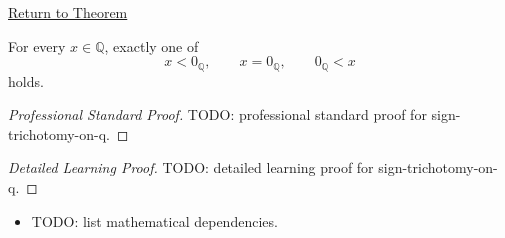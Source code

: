 \newpage
{}
\label{prf:sign-trichotomy-on-q}

\begin{remark*}[Return]
\hyperref[thm:sign-trichotomy-on-q]{Return to Theorem}
\end{remark*}

\begin{theorem*}
For every $x\in\mathbb{Q}$, exactly one of
\[
x<0_{\mathbb{Q}},\qquad x=0_{\mathbb{Q}},\qquad 0_{\mathbb{Q}}<x
\]
holds.
\end{theorem*}

\begin{proof}[Professional Standard Proof]
\LRAProofBodyStart
TODO: professional standard proof for sign-trichotomy-on-q.
\end{proof}

\begin{proof}[Detailed Learning Proof]
\LRAProofBodyStart
TODO: detailed learning proof for sign-trichotomy-on-q.
\end{proof}

\begin{remark*}
\end{remark*}

\begin{dependencies}
\begin{itemize}
  \item TODO: list mathematical dependencies.
\end{itemize}
\end{dependencies}

\clearpage
